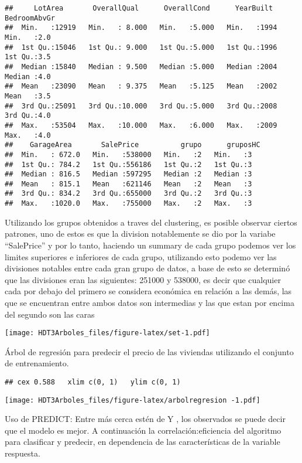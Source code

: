\documentclass[
]{article}
\begin{document}
\begin{verbatim}
##     LotArea       OverallQual      OverallCond      YearBuilt     BedroomAbvGr
##  Min.   :12919   Min.   : 8.000   Min.   :5.000   Min.   :1994   Min.   :2.0  
##  1st Qu.:15046   1st Qu.: 9.000   1st Qu.:5.000   1st Qu.:1996   1st Qu.:3.5  
##  Median :15840   Median : 9.500   Median :5.000   Median :2004   Median :4.0  
##  Mean   :23090   Mean   : 9.375   Mean   :5.125   Mean   :2002   Mean   :3.5  
##  3rd Qu.:25091   3rd Qu.:10.000   3rd Qu.:5.000   3rd Qu.:2008   3rd Qu.:4.0  
##  Max.   :53504   Max.   :10.000   Max.   :6.000   Max.   :2009   Max.   :4.0  
##    GarageArea       SalePrice          grupo      gruposHC
##  Min.   : 672.0   Min.   :538000   Min.   :2   Min.   :3  
##  1st Qu.: 784.2   1st Qu.:556186   1st Qu.:2   1st Qu.:3  
##  Median : 816.5   Median :597295   Median :2   Median :3  
##  Mean   : 815.1   Mean   :621146   Mean   :2   Mean   :3  
##  3rd Qu.: 834.2   3rd Qu.:655000   3rd Qu.:2   3rd Qu.:3  
##  Max.   :1020.0   Max.   :755000   Max.   :2   Max.   :3
\end{verbatim}

Utilizando los grupos obtenidos a traves del clustering, es posible
observar ciertos patrones, uno de estos es que la division notablemente
se dio por la variabe ``SalePrice'' y por lo tanto, haciendo un summary
de cada grupo podemos ver los limites superiores e inferiores de cada
grupo, utilizando esto podemo ver las divisiones notables entre cada
gran grupo de datos, a base de esto se determinó que las divisiones eran
las siguientes: 251000 y 538000, es decir que cualquier cada por debajo
del primero se considera económica en relación a las demás, las que se
encuentran entre ambos datos son intermedias y las que estan por encima
del segundo son las caras

\texttt{[image: HDT3Arboles\_files/figure-latex/set-1.pdf]}

Árbol de regresión para predecir el precio de las viviendas utilizando
el conjunto de entrenamiento.

\begin{verbatim}
## cex 0.588   xlim c(0, 1)   ylim c(0, 1)
\end{verbatim}

\texttt{[image: HDT3Arboles\_files/figure-latex/arbolregresion -1.pdf]}

Uso de PREDICT: Entre más cerca estén de Y , los observados se puede
decir que el modelo es mejor. A continuación la correlación:eficiencia
del algoritmo para clasificar y predecir, en dependencia de las
características de la variable respuesta.
\end{document}
